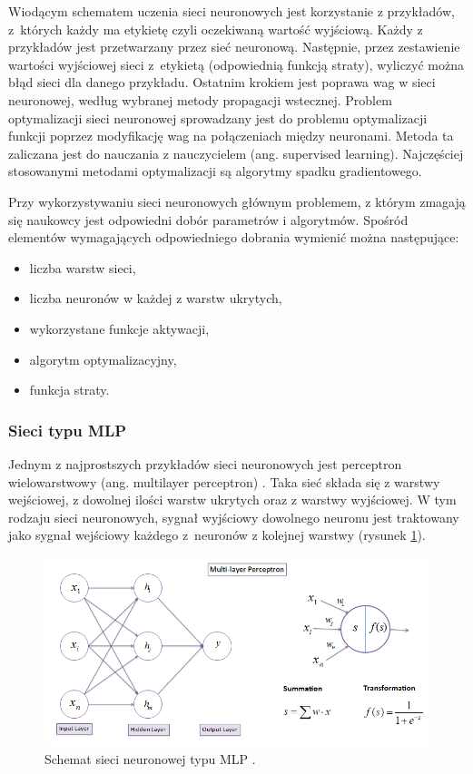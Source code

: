 \documentclass[a4paper, twoside, 11pt, openright]{article}
\begin{document}
\bigskip

Wiodącym schematem uczenia sieci neuronowych jest korzystanie z przykładów, z~których każdy ma etykietę czyli oczekiwaną wartość wyjściową. Każdy z przykładów jest przetwarzany przez sieć neuronową. Następnie, przez zestawienie wartości wyjściowej sieci z~etykietą (odpowiednią funkcją straty), wyliczyć można błąd sieci dla danego przykładu. Ostatnim krokiem jest poprawa wag w sieci neuronowej, według wybranej metody propagacji wstecznej. Problem optymalizacji sieci neuronowej sprowadzany jest do problemu optymalizacji funkcji poprzez modyfikację wag na połączeniach między neuronami. Metoda ta zaliczana jest do nauczania z nauczycielem (ang. supervised learning). Najczęściej stosowanymi metodami optymalizacji są algorytmy spadku gradientowego. 

\bigskip

Przy wykorzystywaniu sieci neuronowych głównym problemem, z którym zmagają się naukowcy jest odpowiedni dobór parametrów i algorytmów. Spośród elementów wymagających odpowiedniego dobrania wymienić można następujące:
\begin{itemize}
\item liczba warstw sieci,
\item liczba neuronów w każdej z warstw ukrytych,
\item wykorzystane funkcje aktywacji,
\item algorytm optymalizacyjny,
\item funkcja straty.
\end{itemize}


\subsubsection{Sieci typu MLP}

Jednym z najprostszych przykładów sieci neuronowych jest perceptron wielowarstwowy (ang. multilayer perceptron) \cite{mlp}. Taka sieć składa się z warstwy wejściowej, z dowolnej ilości warstw ukrytych oraz z warstwy wyjściowej. W tym rodzaju sieci neuronowych, sygnał wyjściowy dowolnego neuronu jest traktowany jako sygnał wejściowy każdego z~neuronów z kolejnej warstwy (rysunek \ref{img:neural-net}). 

\bigskip

\begin{figure}[H]
\centering \includegraphics[scale=0.7]{img/nn.png}
\caption{Schemat sieci neuronowej typu MLP \cite{mlpnn}.}
\label{img:neural-net}
\end{figure}
\end{document}
